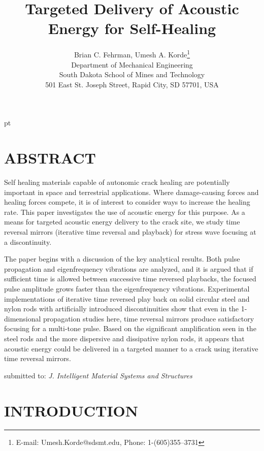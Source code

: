 \documentclass[11pt,letterpaper]{article}%
\title{Targeted Delivery of Acoustic Energy for Self-Healing}
\author{ Brian C. Fehrman, Umesh A. Korde\footnote{E-mail: Umesh.Korde@sdsmt.edu, Phone: 1-(605)355--3731}\\
Department of Mechanical Engineering\\
South Dakota School of Mines and Technology\\
501 East St. Joseph Street, Rapid City, SD 57701, USA\\
}
\begin{document}
%
\maketitle
 pt
\section*{ABSTRACT}
Self healing materials capable of autonomic crack healing are
potentially important in space and terrestrial applications. Where
damage-causing forces and healing forces compete, it is of
interest to consider ways to increase the healing rate. This paper
investigates the use of acoustic energy for this purpose. As a
means for targeted acoustic energy delivery to the crack site, we
study time reversal mirrors (iterative time reversal and playback)
for stress wave focusing at a discontinuity.

The paper begins with a discussion of the key analytical results.
Both pulse propagation and eigenfrequency vibrations are analyzed,
and it is argued that if sufficient time is allowed between
successive time reversed playbacks, the focused pulse amplitude
grows faster than the eigenfrequency vibrations. Experimental implementations
of iterative time reversed play back on solid circular steel and
nylon rods with artificially introduced discontinuities show that
even in the 1-dimensional propagation studies here, time reversal
mirrors produce satisfactory focusing for a multi-tone pulse.
Based on the significant amplification seen in the steel rods and
the more dispersive and dissipative nylon rods, it appears that
acoustic energy could be delivered in a targeted manner to a crack
using iterative time reversal mirrors.


\vspace*{0.1 in} {submitted to: {\em J. Intelligent Material
Systems and Structures}}


\newpage

\printglossary

\newpage

\section{INTRODUCTION}
\label{sect:intro}
\end{document}
